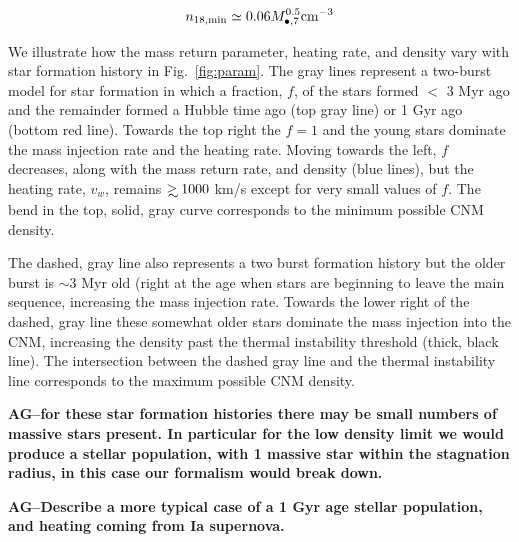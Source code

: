 \documentclass[usenatbib,fleqn]{mnras}
\newcommand\gsim{\mathrel{\rlap{\lower4pt\hbox{\hskip1pt$\sim$}}
    \raise1pt\hbox{$>$}}}
\newcommand{\Mbh}[1][]{M_{\bullet#1}}
\begin{document}
\begin{equation}
n_{\rm 18,min}\simeq 0.06 \Mbh[,7]^{0.5} {\rm cm^{-3}}
\label{eq:n18min}
\end{equation}

We illustrate how the mass return parameter, heating rate, and
density vary with star formation history in Fig.~\ref{fig:param}. The
gray lines represent a two-burst model for star formation in which a
fraction, $f$, of the stars formed $<$ 3 Myr ago and the remainder
formed a Hubble time ago (top gray line) or 1 Gyr ago (bottom red
line).  Towards the top right the $f=1$ and the young stars dominate
the mass injection rate and the heating rate.  Moving towards the
left, $f$ decreases, along with the mass return rate, and density
(blue lines), but the heating rate, $v_w$, remains $\gsim 1000$ km/s
except for very small values of $f$. The bend in the top, solid, gray curve
corresponds to the minimum possible CNM density.

The dashed, gray line also represents a two burst formation history
but the older burst is $\sim 3$ Myr old (right at the age when stars
are beginning to leave the main sequence, increasing the mass
injection rate. Towards the lower right of the dashed, gray line these
somewhat older stars dominate the mass injection into the CNM,
increasing the density past the thermal instability threshold (thick,
black line). The intersection between the dashed gray line and the
thermal instability line corresponds to the maximum possible CNM
density.

{\bf AG--for these star formation histories there may be small numbers
of massive stars present. In particular for the low density limit we
would produce a stellar population, with 1 massive star within the
stagnation radius, in this case our formalism would break down.}

{\bf AG--Describe a more typical case of a 1 Gyr age stellar
  population, and heating coming from Ia supernova.}
\end{document}
